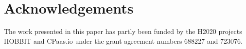 \section*{Acknowledgements}
The work presented in this paper has partly been funded by the H2020 projects HOBBIT and CPaas.io under the grant agreement numbers 688227 and 723076.